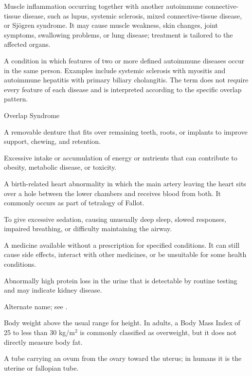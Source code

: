  Muscle inflammation occurring together with another autoimmune connective-tissue disease, such as lupus, systemic sclerosis, mixed connective-tissue disease, or Sjögren syndrome. It may cause muscle weakness, skin changes, joint symptoms, swallowing problems, or lung disease; treatment is tailored to the affected organs.

 A condition in which features of two or
more defined autoimmune diseases occur in the same person. Examples include systemic
sclerosis with myositis and autoimmune hepatitis with primary biliary cholangitis.
The term does not require every feature of each disease and is interpreted according
to the specific overlap pattern.

\synonyms
Overlap Syndrome

 A removable denture that fits over remaining teeth, roots, or implants to improve support, chewing, and retention.

 Excessive intake or accumulation of energy or nutrients that can contribute to obesity, metabolic disease, or toxicity.

 A birth-related heart abnormality in which the main artery leaving the heart sits over a hole between the lower chambers and receives blood from both. It commonly occurs as part of tetralogy of Fallot.

 To give excessive sedation, causing unusually deep sleep, slowed responses, impaired breathing, or difficulty maintaining the airway.

 A medicine available without a prescription for specified conditions. It can still cause side effects, interact with other medicines, or be unsuitable for some health conditions.

 Abnormally high protein loss in the urine that is detectable by routine testing and may indicate kidney disease.

 Alternate name; see .

 Body weight above the usual range for height. In adults, a Body Mass Index of 25 to less than 30 kg/m\(^2\) is commonly classified as overweight, but it does not directly measure body fat.

 A tube carrying an ovum from the ovary toward the uterus; in humans it is the uterine or fallopian tube.

